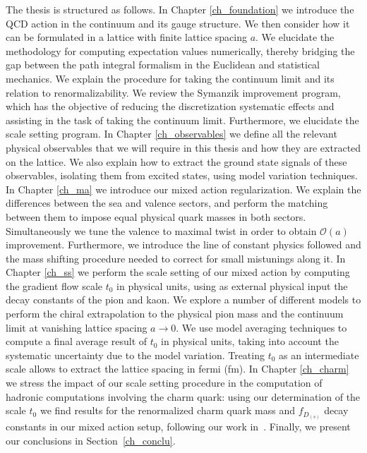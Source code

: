 The thesis is structured as follows. In Chapter \ref{ch_foundation} we introduce the QCD action in the continuum and its gauge structure. We then consider how it can be formulated in a lattice with finite lattice spacing $a$. We elucidate the methodology for computing expectation values numerically, thereby bridging the gap between the path integral formalism in the Euclidean and statistical mechanics. We explain the procedure for taking the continuum limit and its relation to renormalizability. We review the Symanzik improvement program, which has the objective of reducing the discretization systematic effects and assisting in the task of taking the continuum limit. Furthermore, we elucidate the scale setting program. In Chapter \ref{ch_observables} we define all the relevant physical observables that we will require in this thesis and how they are extracted on the lattice. We also explain how to extract the ground state signals of these observables, isolating them from excited states, using model variation techniques. In Chapter \ref{ch_ma} we introduce our mixed action regularization. We explain the differences between the sea and valence sectors, and perform the matching between them to impose equal physical quark masses in both sectors. Simultaneously we tune the valence to maximal twist in order to obtain $\mathcal{O}(a)$ improvement. Furthermore, we introduce the line of constant physics followed and the mass shifting procedure needed to correct for small mistunings along it. In Chapter \ref{ch_ss} we perform the scale setting of our mixed action by computing the gradient flow scale $t_0$ in physical units, using as external physical input the decay constants of the pion and kaon. We explore a number of different models to perform the chiral extrapolation to the physical pion mass and the continuum limit at vanishing lattice spacing $a\to0$. We use model averaging techniques to compute a final average result of $t_0$ in physical units, taking into account the systematic uncertainty due to the model variation. Treating $t_0$ as an intermediate scale allows to extract the lattice spacing in fermi (fm). In Chapter \ref{ch_charm} we stress the impact of our scale setting procedure in the computation of hadronic computations involving the charm quark: using our determination of the scale $t_0$ we find results for the renormalized charm quark mass and $f_{D_{(s)}}$ decay constants in our mixed action setup, following our work in~\citep{charm}. Finally, we present our conclusions in Section~\ref{ch_conclu}.

